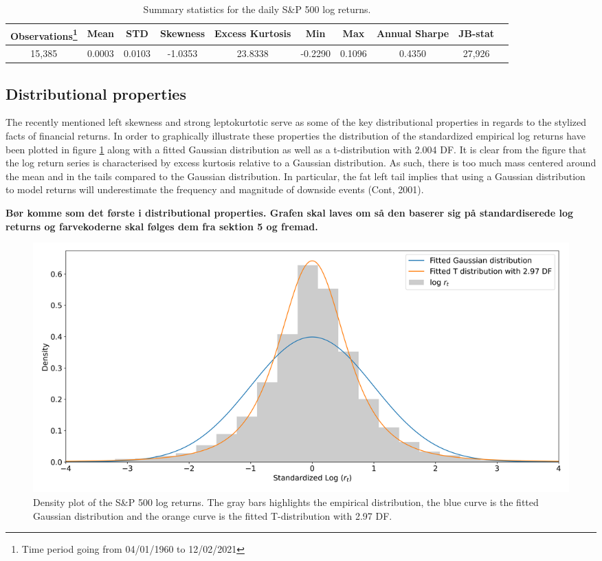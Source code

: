 \begin{table}[H]
\small
\caption{Summary statistics for the daily S\&P 500 log returns.}
\centering
\begin{tabular}{c c c c c c c c c c} 
\hline\hline
Observations\footnote{Time period going from 04/01/1960 to 12/02/2021} & Mean & STD & Skewness & Excess Kurtosis & Min & Max & Annual Sharpe & JB-stat \\
\hline
15,385 & 0.0003 & 0.0103 & -1.0353 & 23.8338 & -0.2290 & 0.1096 & 0.4350 & 27,926 \\
\hline
\end{tabular}
\label{tab:summary_stats_S&P500}
\end{table}
 

\subsection{Distributional properties} 
The recently mentioned left skewness and strong leptokurtotic serve as some of the key distributional properties in regards to the stylized facts of financial returns. In order to graphically illustrate these properties the distribution of the standardized empirical log returns have been plotted in figure \ref{fig: Kernel_distributions} along with a fitted Gaussian distribution as well as a t-distribution with 2.004 DF. It is clear from the figure that the log return series is characterised by excess kurtosis relative to a Gaussian distribution. As such, there is too much mass centered around the mean and in the tails compared to the Gaussian distribution. In particular, the fat left tail implies that using a Gaussian distribution to model returns will underestimate the frequency and magnitude of downside events (Cont, 2001). 

\textbf{Bør komme som det første i distributional properties. Grafen skal laves om så den baserer sig på standardiserede log returns og farvekoderne skal følges dem fra sektion 5 og fremad.}
\begin{figure}[H] 
    \centering
    \includegraphics[width=1\textwidth]{analysis/data_description/images/SP500_distribution.png}
    \caption[Density plot of the S\&P 500 log returns] {Density plot of the S\&P 500 log returns. The gray bars highlights the empirical distribution, the blue curve is the fitted Gaussian distribution and the orange curve is the fitted T-distribution with 2.97 DF.}
    \label{fig: Kernel_distributions}
\end{figure}

